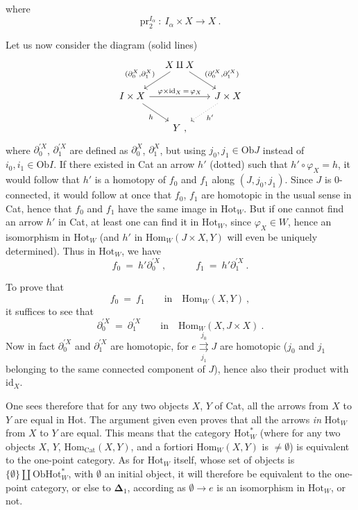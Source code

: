 \documentclass[11pt]{article}
\newcommand{\printedpage}[1]{\marginpar{\footnotesize p.~#1}}
\newcommand{\msp}[1]{\marginpar{\footnotesize [#1]}}
\newcommand{\Hot}{\mathrm{Hot}}
\newcommand{\Hom}{\mathrm{Hom}}
\newcommand{\Cat}{\mathrm{Cat}}
\newcommand{\Ob}{\mathrm{Ob}}
\newcommand{\pr}{\mathrm{pr}}
\newcommand{\id}{\mathrm{id}}
\begin{document}
\printedpage{69}
where
\[
\pr_2^{I_\alpha}\ :\ I_\alpha\times X \longrightarrow X\ .
\]

\msp{page 128}Let us now consider the diagram (solid lines)
\[
\begin{tikzcd}[column sep=small]
& X\amalg X \arrow[dl, "{(\partial_0^X,\partial_1^X)}"'] \arrow[dr, "{(\partial_0^{\prime X},\partial_1^{\prime X})}"] & \\
I\times X \arrow[rr, "\varphi\times\id_X\,=\,\varphi_X"] \arrow[dr, "h"'] & & J\times X \arrow[dl, dotted, "h'"] \\
& Y\ , &
\end{tikzcd}
\]
where $\partial_0^{\prime X}$, $\partial_1^{\prime X}$ are defined as $\partial_0^X$, $\partial_1^X$, but using $j_0,j_1\in\Ob J$ instead of $i_0,i_1\in\Ob I$. If there existed in Cat an arrow $h'$ (dotted) such that $h'\circ\varphi_X=h$, it would follow that $h'$ is a homotopy of $f_0$ and $f_1$ along $(J,j_0,j_1)$. Since $J$ is 0-connected, it would follow at once that $f_0$, $f_1$ are homotopic in the usual sense in Cat, hence that $f_0$ and $f_1$ have the same image in $\Hot_W$. But if one cannot find an arrow $h'$ in Cat, at least one can find it in $\Hot_W$, since $\varphi_X\in W$, hence an isomorphism in $\Hot_W$ (and $h'$ in $\Hom_W(J\times X,Y)$ will even be uniquely determined). Thus in $\Hot_W$, we have
\[
f_0\ =\ h'\partial_0^{\prime X}\ ,\qquad\quad f_1\ =\ h'\partial_1^{\prime X}\ .
\]

\msp{page 129}To prove that
\[
f_0\ =\ f_1\qquad\text{in}\quad\Hom_W(X,Y)\ ,
\]
it suffices to see that
\[
\partial_0^{\prime X}\ =\ \partial_1^{\prime X}\qquad\text{in}\quad\Hom_W(X,J\times X)\ .
\]
Now in fact $\partial_0^{\prime X}$ and $\partial_1^{\prime X}$ are homotopic, for $e\underset{j_1}{\overset{j_0}{\rightrightarrows}}J$ are homotopic ($j_0$ and $j_1$ belonging to the same connected component of $J$), hence also their product with $\id_X$.

One sees therefore that for any two objects $X$, $Y$ of Cat, all the arrows from $X$ to $Y$ are equal in Hot. The argument given even proves that all the arrows \textit{in} $\Hot_W$ from $X$ to $Y$ are equal. This means that the category $\Hot_W^*$ (where for any two objects $X$, $Y$, $\Hom_{\Cat}(X,Y)$, and a fortiori $\Hom_W(X,Y)$ is $\neq\emptyset$) is equivalent to the one-point category. As for $\Hot_W$ itself, whose set of objects is $\{\emptyset\}\amalg\Ob\Hot_W^*$, with $\emptyset$ an initial object, it will therefore be equivalent to the one-point category, or else to $\boldsymbol{\Delta}_1$, according as $\emptyset\longrightarrow e$ is an isomorphism in $\Hot_W$, or not.
\end{document}
